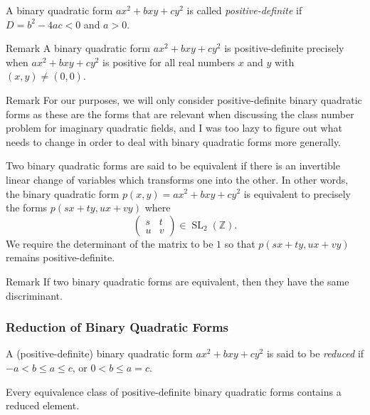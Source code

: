 \documentclass{beamer}
\begin{document}
\begin{frame}
	
	\begin{definition}
		A binary quadratic form $ax^2 + bxy + cy^2$ is called \emph{positive-definite} if $D = b^2 - 4ac < 0$ and $a > 0$.
	\end{definition}
	\pause

	\begin{block}{Remark}
		A binary quadratic form $ax^2 + bxy + cy^2$ is positive-definite precisely when $ax^2 + bxy + cy^2$ is positive for all real numbers $x$ and $y$ with $(x, y) \neq (0, 0)$.
	\end{block}
	\pause

	\begin{block}{Remark}
		For our purposes, we will only consider positive-definite binary quadratic forms as these are the forms that are relevant when discussing the class number problem for imaginary quadratic fields, and I was too lazy to figure out what needs to change in order to deal with binary quadratic forms more generally.
	\end{block}

\end{frame}

\begin{frame}
	
	\begin{definition}[Equivalence]
		Two binary quadratic forms are said to be equivalent if there is an invertible linear change of variables which transforms one into the other. In other words, the binary quadratic form $p(x, y) = ax^2 + bxy + cy^2$ is equivalent to precisely the forms $p(sx + ty, ux + vy)$ where
		\[
			\begin{pmatrix} s & t \\ u & v \end{pmatrix} \in \operatorname{SL}_2(\mathbb{Z}).
		\]
		We require the determinant of the matrix to be $1$ so that $p(sx + ty, ux + vy)$ remains positive-definite.
	\end{definition}

	\begin{block}{Remark}
		If two binary quadratic forms are equivalent, then they have the same discriminant.
	\end{block}

\end{frame}

\begin{frame}

	\frametitle{Reduction of Binary Quadratic Forms}

	\begin{definition}
		A (positive-definite) binary quadratic form $ax^2 + bxy + cy^2$ is said to be \emph{reduced} if $-a < b \leq a \leq c$, or $0 < b \leq a = c$.
	\end{definition}
	\pause

	\begin{theorem}
		Every equivalence class of positive-definite binary quadratic forms contains a reduced element.
	\end{theorem}

\end{frame}
\end{document}
